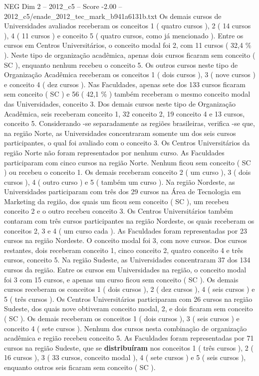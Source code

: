 \begin{textsample}{NEG Dim 2 – 2012\_c5 – Score -2.00 – 2012\_c5/enade\_2012\_tec\_mark\_b941a6131b.txt}
Os demais cursos de Universidades avaliados receberam os conceitos 1 ( quatro cursos ), 2 ( 14 cursos ), 4 ( 11 cursos ) e conceito 5 ( quatro cursos, como já mencionado ).
Entre os cursos em Centros Universitários, o conceito modal foi 2, com 11 cursos ( 32,4 \% ).
Neste tipo de organização acadêmica, apenas dois cursos ficaram sem conceito ( SC ), enquanto nenhum recebeu o conceito 5.
Os outros cursos neste tipo de Organização Acadêmica receberam os conceitos 1 ( dois cursos ), 3 ( nove cursos ) e conceito 4 ( dez cursos ).
Nas Faculdades, apenas sete dos 133 cursos ficaram sem conceito ( SC ) e 56 ( 42,1 \% ) também receberam o mesmo conceito modal das Universidades, conceito 3.
Dos demais cursos neste tipo de Organização Acadêmica, seis receberam conceito 1, 32 conceito 2, 19 conceito 4 e 13 cursos, conceito 5.
Considerando -se separadamente as regiões brasileiras, verifica -se que, na região Norte, as Universidades concentraram somente um dos seis cursos participantes, o qual foi avaliado com o conceito 3.
Os Centros Universitários da região Norte não foram representados por nenhum curso.
As Faculdades participaram com cinco cursos na região Norte.
Nenhum ficou sem conceito ( SC ) ou recebeu o conceito 1.
Os demais receberam conceito 2 ( um curso ), 3 ( dois cursos ), 4 ( outro curso ) e 5 ( também um curso ).
Na região Nordeste, as Universidades participaram com três dos 29 cursos na Área de Tecnologia em Marketing da região, dos quais um ficou sem conceito ( SC ), um recebeu conceito 2 e o outro recebeu conceito 3.
Os Centros Universitários também contaram com três cursos participantes na região Nordeste, os quais receberam os conceitos 2, 3 e 4 ( um curso cada ).
As Faculdades foram representadas por 23 cursos na região Nordeste.
O conceito modal foi 3, com nove cursos.
Dos cursos restantes, dois receberam conceito 1, cinco conceito 2, quatro conceito 4 e três cursos, conceito 5.
Na região Sudeste, as Universidades concentraram 37 dos 134 cursos da região.
Entre os cursos em Universidades na região, o conceito modal foi 3 com 15 cursos, e apenas um curso ficou sem conceito ( SC ).
Os demais cursos receberam os conceitos 1 ( dois cursos ), 2 ( dez cursos ), 4 ( seis cursos ) e 5 ( três cursos ).
Os Centros Universitários participaram com 26 cursos na região Sudeste, dos quais nove obtiveram conceito modal, 2, e dois ficaram sem conceito ( SC ).
Os demais receberam os conceitos 1 ( dois cursos ), 3 ( seis cursos ) e conceito 4 ( sete cursos ).
Nenhum dos cursos nesta combinação de organização acadêmica e região recebeu conceito 5.
As Faculdades foram representadas por 71 cursos na região Sudeste, que se \textbf{distribuíram} nos conceitos 1 ( três cursos ), 2 ( 16 cursos ), 3 ( 33 cursos, conceito modal ), 4 ( sete cursos ) e 5 ( seis cursos ), enquanto outros seis ficaram sem conceito ( SC ).

\end{textsample}
